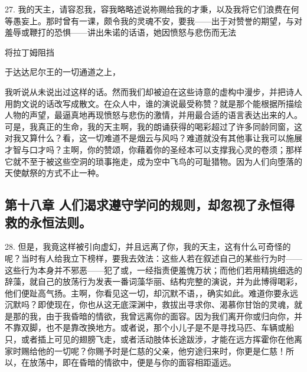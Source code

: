 27. 我的天主，请容忍我，容我略略述说祢赐给我的才秉，以及我将它们浪费在何等愚妄上。那时曾有一课，颇令我的灵魂不安，要我——出于对赞誉的期望，与对羞辱或鞭打的恐惧——讲出朱诺的话语，她因愤怒与悲伤而无法\par

将拉丁姆阻挡\par

于达达尼尔王的一切通道之上，\par

我听说从未说出过这样的话。然而我们却被迫在这些诗意的虚构中漫步，并把诗人用韵文说的话改写成散文。在众人中，谁的演说最受称赞？就是那个能根据所描绘人物的声望，最逼真地再现愤怒与悲伤的激情，并用最合适的语言表达出来的人。可是，我真正的生命，我的天主啊，我的朗诵获得的喝彩超过了许多同龄同窗，这对我又算什么？看，这一切难道不是烟云与风吗？难道就没有其他事让我可以施展才智与口才吗？主啊，你的赞颂，你藉着你的圣经本可以支撑我心灵的卷须；那样它就不至于被这些空洞的琐事拖走，成为空中飞鸟的可耻猎物。因为人们向堕落的天使献祭的方式不止一种。\par


\subsection{第十八章 人们渴求遵守学问的规则，却忽视了永恒得救的永恒法则。}

28. 但是，我竟这样被引向虚幻，并且远离了你，我的天主，这有什么可奇怪的呢？当时有人给我立下榜样，要我去效法：这些人若在叙述自己的某些行为时——这些行为本身并不邪恶——犯了或，一经指责便羞愧万状；而他们若用精挑细选的辞藻，就自己的放荡行为发表一番词藻华丽、结构完整的演说，并为此博得喝彩，他们便趾高气扬。主啊，你看见这一切，却沉默不语，，确实如此。难道你要永远沉默吗？即使现在，你也从这无底深渊中，救拔出寻求你、渴慕你甘饴的灵魂，就是那的我，由于我昏暗的情欲，我曾远离你的面容。因为我们离开你或归向你，并不靠双脚，也不是靠改换地方。或者说，那个小儿子是不是寻找马匹、车辆或船只，或者插上可见的翅膀飞走，或者活动肢体长途跋涉，才能在远方挥霍你在他离家时赐给他的一切呢？你赐予时是仁慈的父亲，他穷途归来时，你更是仁慈！所以，在放荡中，即在昏暗的情欲中，便是与你的面容相距遥远。\par

